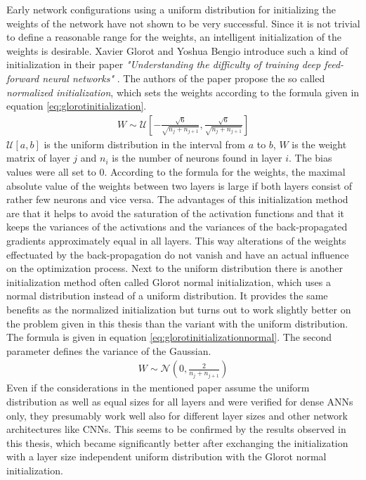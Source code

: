 \documentclass[11pt, a4paper]{article}
\newcommand\q[1]{\emph{"#1"}}
\begin{document}
Early network configurations using a uniform distribution for initializing the weights of the network have not shown to be very successful. Since it is not trivial to define a reasonable range for the weights, an intelligent initialization of the weights is desirable. Xavier Glorot and Yoshua Bengio introduce such a kind of initialization in their paper \q{Understanding the difficulty of training deep feed-forward neural networks} \cite{glorotinitialization}. The authors of the paper propose the so called \emph{normalized initialization}, which sets the weights according to the formula given in equation \eqref{eq:glorotinitialization}.
\begin{align}
\label{eq:glorotinitialization}
W \sim \mathcal{U} \left[ - \frac{\sqrt{6}}{\sqrt{n_j + n_{j+1}}}, \frac{\sqrt{6}}{\sqrt{n_j + n_{j+1}}} \right]
\end{align}
$\mathcal{U}[a,b]$ is the uniform distribution in the interval from $a$ to $b$, $W$ is the weight matrix of layer $j$ and $n_i$ is the number of neurons found in layer $i$. The bias values were all set to $0$. According to the formula for the weights, the maximal absolute value of the weights between two layers is large if both layers consist of rather few neurons and vice versa.
The advantages of this initialization method are that it helps to avoid the saturation of the activation functions and that it keeps the variances of the activations and the variances of the back-propagated gradients approximately equal in all layers. This way alterations of the weights effectuated by the back-propagation do not vanish and have an actual influence on the optimization process. Next to the uniform distribution there is another initialization method often called Glorot normal initialization, which uses a normal distribution instead of a uniform distribution. It provides the same benefits as the normalized initialization but turns out to work slightly better on the problem given in this thesis than the variant with the uniform distribution. The formula is given in equation \eqref{eq:glorotinitializationnormal}. The second parameter defines the variance of the Gaussian.
\begin{align}
\label{eq:glorotinitializationnormal}
W \sim \mathcal{N} \left(0, \frac{2}{n_j + n_{j+1}} \right)
\end{align}
Even if the considerations in the mentioned paper assume the uniform distribution as well as equal sizes for all layers and were verified for dense \acp{ANN} only, they presumably work well also for different layer sizes and other network architectures like \acp{CNN}. This seems to be confirmed by the results observed in this thesis, which became significantly better after exchanging the initialization with a layer size independent uniform distribution with the Glorot normal initialization.\\
\end{document}
